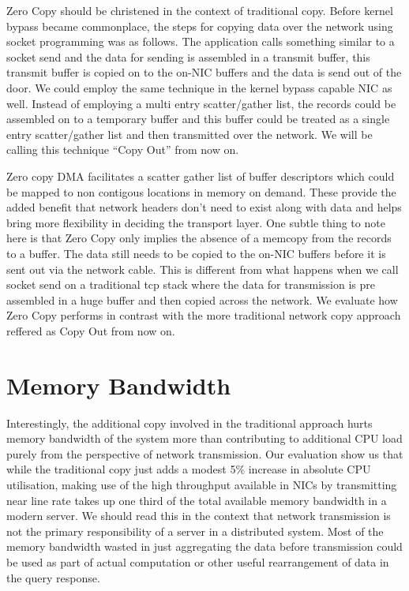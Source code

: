 Zero Copy should be christened in the context of traditional copy. Before kernel bypass became 
commonplace, the steps for copying data over the network using socket programming was as follows. 
The application calls something similar to a socket send and the data for sending is assembled 
in a transmit buffer, this transmit buffer is copied on to the on-NIC buffers and the data is 
send out of the door. We could employ the same technique in the kernel bypass capable NIC as well.
Instead of employing a multi entry scatter/gather list, the records could be assembled on 
to a temporary buffer and this buffer could be treated as a single entry scatter/gather list
and then transmitted over the network. We will be calling this technique \enquote{Copy Out} from now on.


Zero copy DMA facilitates a scatter gather list of buffer descriptors
which could be mapped to non contigous locations in memory on demand. These provide
the added benefit that network headers don't need to exist along with data and helps bring more flexibility 
in deciding the transport layer. One subtle thing to note here is that Zero Copy only implies the absence 
of a memcopy from the records to a buffer. The data still needs to be copied to the on-NIC buffers before 
it is sent out via the network cable. This is different from what happens when we call socket send on a traditional 
tcp stack where the data for transmission is pre assembled in a huge buffer and then copied across the network.
We evaluate how Zero Copy performs in contrast with the more traditional network copy approach reffered
 as Copy Out from now on.

\section{Memory Bandwidth}
Interestingly, the additional copy involved in the traditional approach hurts memory bandwidth of the system more than contributing 
to additional CPU load purely from the perspective of network transmission. Our evaluation show us that while the traditional
copy just adds a modest 5\% increase in absolute CPU utilisation, making use of the high throughput available in NICs by transmitting
near line rate takes up one third of the total available memory bandwidth in a modern server. We should read this in the context that 
network transmission is not the primary responsibility of a server in a distributed system. Most of the memory bandwidth wasted in 
just aggregating the data before transmission could be used as part of actual computation or other useful rearrangement of data in 
the query response.


